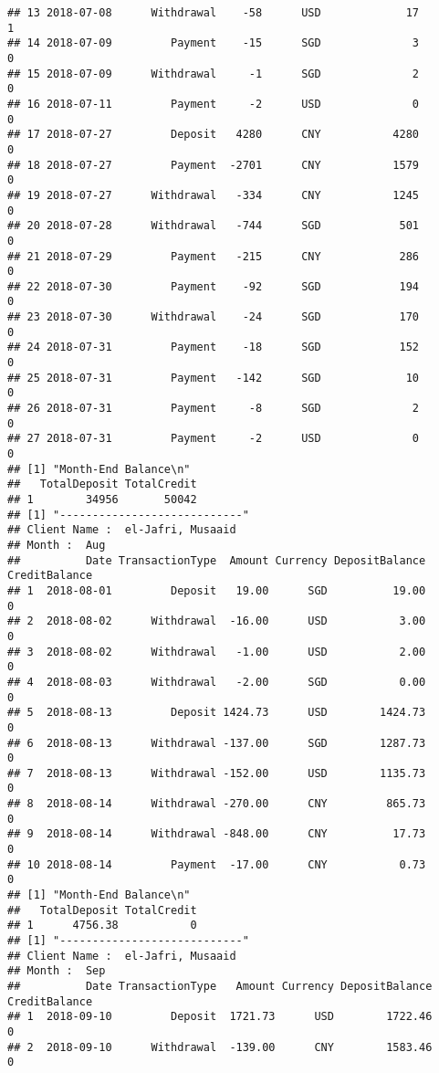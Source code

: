 \documentclass[]{article}
\begin{document}
\begin{verbatim}
## 13 2018-07-08      Withdrawal    -58      USD             17             1
## 14 2018-07-09         Payment    -15      SGD              3             0
## 15 2018-07-09      Withdrawal     -1      SGD              2             0
## 16 2018-07-11         Payment     -2      USD              0             0
## 17 2018-07-27         Deposit   4280      CNY           4280             0
## 18 2018-07-27         Payment  -2701      CNY           1579             0
## 19 2018-07-27      Withdrawal   -334      CNY           1245             0
## 20 2018-07-28      Withdrawal   -744      SGD            501             0
## 21 2018-07-29         Payment   -215      CNY            286             0
## 22 2018-07-30         Payment    -92      SGD            194             0
## 23 2018-07-30      Withdrawal    -24      SGD            170             0
## 24 2018-07-31         Payment    -18      SGD            152             0
## 25 2018-07-31         Payment   -142      SGD             10             0
## 26 2018-07-31         Payment     -8      SGD              2             0
## 27 2018-07-31         Payment     -2      USD              0             0
## [1] "Month-End Balance\n"
##   TotalDeposit TotalCredit
## 1        34956       50042
## [1] "----------------------------"
## Client Name :  el-Jafri, Musaaid 
## Month :  Aug 
##          Date TransactionType  Amount Currency DepositBalance CreditBalance
## 1  2018-08-01         Deposit   19.00      SGD          19.00             0
## 2  2018-08-02      Withdrawal  -16.00      USD           3.00             0
## 3  2018-08-02      Withdrawal   -1.00      USD           2.00             0
## 4  2018-08-03      Withdrawal   -2.00      SGD           0.00             0
## 5  2018-08-13         Deposit 1424.73      USD        1424.73             0
## 6  2018-08-13      Withdrawal -137.00      SGD        1287.73             0
## 7  2018-08-13      Withdrawal -152.00      USD        1135.73             0
## 8  2018-08-14      Withdrawal -270.00      CNY         865.73             0
## 9  2018-08-14      Withdrawal -848.00      CNY          17.73             0
## 10 2018-08-14         Payment  -17.00      CNY           0.73             0
## [1] "Month-End Balance\n"
##   TotalDeposit TotalCredit
## 1      4756.38           0
## [1] "----------------------------"
## Client Name :  el-Jafri, Musaaid 
## Month :  Sep 
##          Date TransactionType   Amount Currency DepositBalance CreditBalance
## 1  2018-09-10         Deposit  1721.73      USD        1722.46             0
## 2  2018-09-10      Withdrawal  -139.00      CNY        1583.46             0

\end{verbatim}
\end{document}
